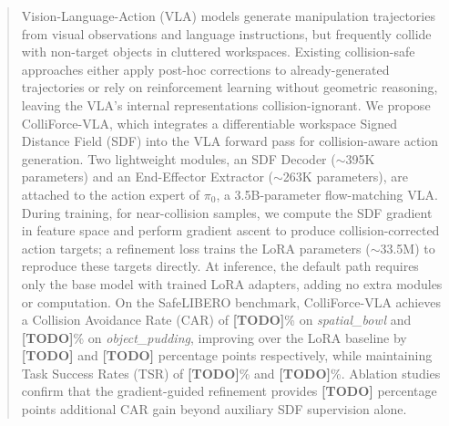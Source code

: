 \begin{abstract}
Vision-Language-Action (VLA) models generate manipulation trajectories from visual observations and language instructions, but frequently collide with non-target objects in cluttered workspaces. Existing collision-safe approaches either apply post-hoc corrections to already-generated trajectories or rely on reinforcement learning without geometric reasoning, leaving the VLA's internal representations collision-ignorant. We propose ColliForce-VLA, which integrates a differentiable workspace Signed Distance Field (SDF) into the VLA forward pass for collision-aware action generation. Two lightweight modules, an SDF Decoder (${\sim}$395K parameters) and an End-Effector Extractor (${\sim}$263K parameters), are attached to the action expert of $\pi_0$, a 3.5B-parameter flow-matching VLA. During training, for near-collision samples, we compute the SDF gradient in feature space and perform gradient ascent to produce collision-corrected action targets; a refinement loss trains the LoRA parameters (${\sim}$33.5M) to reproduce these targets directly. At inference, the default path requires only the base model with trained LoRA adapters, adding no extra modules or computation. On the SafeLIBERO benchmark, ColliForce-VLA achieves a Collision Avoidance Rate (CAR) of \textbf{[TODO]}\% on \textit{spatial\_bowl} and \textbf{[TODO]}\% on \textit{object\_pudding}, improving over the LoRA baseline by \textbf{[TODO]} and \textbf{[TODO]} percentage points respectively, while maintaining Task Success Rates (TSR) of \textbf{[TODO]}\% and \textbf{[TODO]}\%. Ablation studies confirm that the gradient-guided refinement provides \textbf{[TODO]} percentage points additional CAR gain beyond auxiliary SDF supervision alone.
\end{abstract}